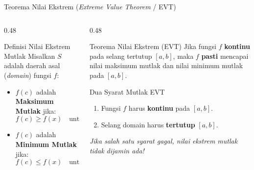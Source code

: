 \documentclass[aspectratio=169,10pt]{beamer}
\begin{document}
\begin{frame}{Teorema Nilai Ekstrem (\textit{Extreme Value Theorem} / EVT)}
    \begin{columns}[T]
        \begin{column}{0.48\textwidth}
            \begin{block}{Definisi Nilai Ekstrem Mutlak}
                Misalkan $S$ adalah daerah asal (\textit{domain}) fungsi $f$:
                \begin{itemize}
                    \item $f(c)$ adalah \textbf{Maksimum Mutlak} jika:
                    \[
                        f(c) \ge f(x) \quad \text{untuk semua } x \in S
                    \]
                    \item $f(c)$ adalah \textbf{Minimum Mutlak} jika:
                    \[
                        f(c) \le f(x) \quad \text{untuk semua } x \in S
                    \]
                \end{itemize}
            \end{block}
        \end{column}

        \begin{column}{0.48\textwidth}
            \begin{exampleblock}{Teorema Nilai Ekstrem (EVT)}
                Jika fungsi $f$ \textbf{kontinu} pada selang tertutup $[a, b]$, maka $f$ \textbf{pasti} mencapai nilai maksimum mutlak dan nilai minimum mutlak pada $[a, b]$.
            \end{exampleblock}

            \begin{alertblock}{Dua Syarat Mutlak EVT}
                \begin{enumerate}
                    \item Fungsi $f$ harus \textbf{kontinu} pada $[a, b]$.
                    \item Selang domain harus \textbf{tertutup} $[a, b]$.
                \end{enumerate}
                {\scriptsize \color{SoftGray} \textit{Jika salah satu syarat gagal, nilai ekstrem mutlak tidak dijamin ada!}}
            \end{alertblock}
        \end{column}
    \end{columns}
\end{frame}
\end{document}

